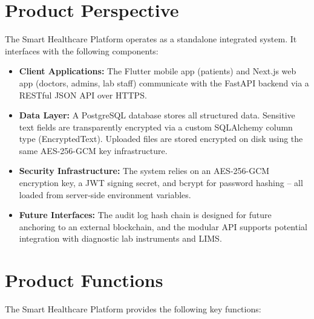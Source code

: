 \documentclass[a4paper,12pt]{report}
\begin{document}
\section{Product Perspective}

The Smart Healthcare Platform operates as a standalone integrated system. It interfaces with the following components:

\begin{itemize}
    \item \textbf{Client Applications:} The Flutter mobile app (patients) and Next.js web app (doctors, admins, lab staff) communicate with the FastAPI backend via a RESTful JSON API over HTTPS.
    \item \textbf{Data Layer:} A PostgreSQL database stores all structured data. Sensitive text fields are transparently encrypted via a custom SQLAlchemy column type (EncryptedText). Uploaded files are stored encrypted on disk using the same AES-256-GCM key infrastructure.
    \item \textbf{Security Infrastructure:} The system relies on an AES-256-GCM encryption key, a JWT signing secret, and bcrypt for password hashing -- all loaded from server-side environment variables.
    \item \textbf{Future Interfaces:} The audit log hash chain is designed for future anchoring to an external blockchain, and the modular API supports potential integration with diagnostic lab instruments and LIMS.
\end{itemize}

\section{Product Functions}

The Smart Healthcare Platform provides the following key functions:
\end{document}
